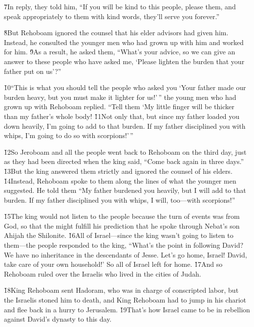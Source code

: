 \v{7}In reply, they told him, ``If you will be kind to this people, please them, and speak appropriately to them with kind words, they'll serve you forever.''

\v{8}But Rehoboam ignored the counsel that his elder advisors had given him. Instead, he consulted the younger men who had grown up with him and worked for him. \v{9}As a result, he asked them, ``What's your advice, so we can give an answer to these people who have asked me, `Please lighten the burden that your father put on us'?''

\v{10}``This is what you should tell the people who asked you `Your father made our burden heavy, but you must make it lighter for us!'\,'' the young men who had grown up with Rehoboam replied. ``Tell them `My little finger will be thicker than my father's whole body! \v{11}Not only that, but since my father loaded you down heavily, I'm going to add to that burden. If my father disciplined you with whips, I'm going to do so with scorpions!'\,''

\v{12}So Jeroboam and all the people went back to Rehoboam on the third day, just as they had been directed when the king said, ``Come back again in three days.'' \v{13}But the king answered them strictly and ignored the counsel of his elders. \v{14}Instead, Rehoboam spoke to them along the lines of what the younger men suggested. He told them ``My father burdened you heavily, but I will add to that burden. If my father disciplined you with whips, I will, too---with scorpions!''

\v{15}The king would not listen to the people because the turn of events was from God, so that the  might fulfill his prediction that he spoke through Nebat's son Ahijah the Shilonite. \v{16}All of Israel---since the king wasn't going to listen to them---the people responded to the king, ``What's the point in following David? We have no inheritance in the descendants of Jesse. Let's go home, Israel! David, take care of your own household!' So all of Israel left for home. \v{17}And so Rehoboam ruled over the Israelis who lived in the cities of Judah.

\v{18}King Rehoboam sent Hadoram, who was in charge of conscripted labor, but the Israelis stoned him to death, and King Rehoboam had to jump in his chariot and flee back in a hurry to Jerusalem. \v{19}That's how Israel came to be in rebellion against David's dynasty to this day.

